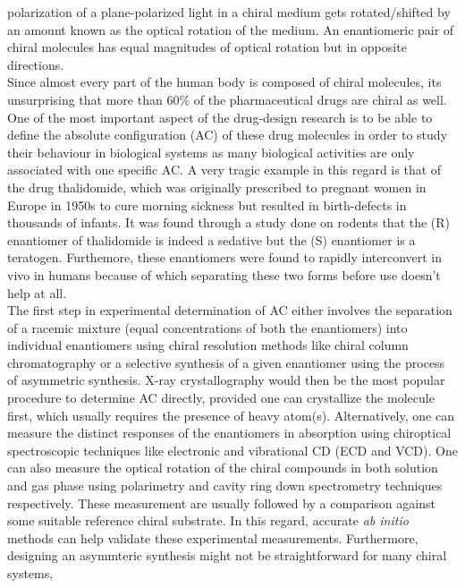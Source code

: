 polarization of a plane-polarized light in a chiral medium gets rotated/shifted by an amount known as 
the optical rotation of the medium. An enantiomeric pair of chiral molecules has equal magnitudes of 
optical rotation but in opposite directions.\\
Since almost every part of the human body is composed of chiral molecules, its unsurprising that
more than 60\% of the pharmaceutical drugs are chiral as well. One of the most 
important aspect of the drug-design research is to be able to define the absolute configuration 
(AC) of these drug molecules in order to study their behaviour in biological systems as 
many biological activities are only associated with one specific AC. A very tragic example
in this regard is that of the drug thalidomide, which was originally prescribed to pregnant women in 
Europe in 1950s to cure morning sickness but resulted in birth-defects in thousands of 
infants. It was found through a study done on rodents that the (R) enantiomer of thalidomide is indeed 
a sedative but the (S) enantiomer is a teratogen\cite{Crawford06}. Furthemore, these enantiomers were 
found to rapidly interconvert in vivo in humans because of which separating 
these two forms before use doesn't help at all.
\\
The first step in experimental determination of AC either involves the separation of 
a racemic mixture (equal concentrations of both the enantiomers) into individual enantiomers
using chiral resolution methods like chiral column chromatography or a selective synthesis
of a given enantiomer using the process of asymmetric synthesis. X-ray crystallography would then be the 
most popular procedure to determine AC directly, provided one can crystallize the molecule first, which usually 
requires the presence of heavy atom(s). Alternatively, one can measure the distinct responses of 
the enantiomers in absorption using chiroptical spectroscopic techniques like electronic and vibrational 
CD (ECD and VCD). One can also measure the optical rotation of the chiral compounds in both solution
and gas phase using polarimetry and cavity ring down spectrometry techniques respectively.
These measurement are usually followed by a comparison against some suitable reference chiral
substrate. In this regard, accurate {\em ab initio} methods can help validate these experimental measurements.
Furthermore, designing an asymmteric synthesis might not be straightforward for many chiral systems, 
